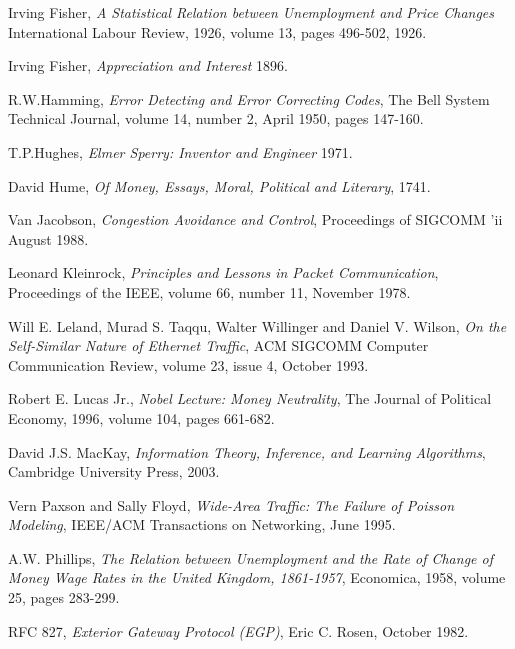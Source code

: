 \begin{thebibliography}{9}
    Irving Fisher, 
    \emph{A Statistical Relation between Unemployment and Price Changes}
    International Labour Review,
    1926,
    volume 13,
    pages 496-502,
    1926.

    Irving Fisher,
    \emph{Appreciation and Interest}
    1896.

    R.W.Hamming,
    \emph{Error Detecting and Error Correcting Codes},
    The Bell System Technical Journal,
    volume 14,
    number 2,
    April 1950,
    pages 147-160.

    T.P.Hughes,
    \emph{Elmer Sperry: Inventor and Engineer}
    1971.

    David Hume,
    \emph{Of Money, Essays, Moral, Political and Literary},
    1741.

    Van Jacobson,
    \emph{Congestion Avoidance and Control},
    Proceedings of SIGCOMM 'ii
    August 1988.

    Leonard Kleinrock,
    \emph{Principles and Lessons in Packet Communication},
    Proceedings of the IEEE,
    volume 66,
    number 11,
    November 1978.

    Will E. Leland, Murad S. Taqqu, Walter Willinger and Daniel V. Wilson,
    \emph{On the Self-Similar Nature of Ethernet Traffic},
    ACM SIGCOMM Computer Communication Review,
    volume 23,
    issue 4,
    October 1993.

    Robert E. Lucas Jr.,
    \emph{Nobel Lecture: Money Neutrality},
    The Journal of Political Economy,
    1996,
    volume 104,
    pages 661-682.

    David J.S. MacKay,
    \emph{Information Theory, Inference, and Learning Algorithms},
    Cambridge University Press,
    2003.

    Vern Paxson and Sally Floyd,
    \emph{Wide-Area Traffic: The Failure of Poisson Modeling},
    IEEE/ACM Transactions on Networking,
    June 1995.

    A.W. Phillips,
    \emph{The Relation between Unemployment and the Rate of Change of Money Wage Rates in the United Kingdom, 1861-1957},
    Economica,
    1958,
    volume 25,
    pages 283-299.

    RFC 827,
    \emph{Exterior Gateway Protocol (EGP)},
    Eric C. Rosen,
    October 1982.


\end{thebibliography}
